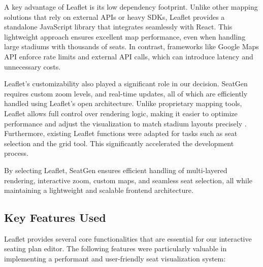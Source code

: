 A key advantage of Leaflet is its low dependency footprint. Unlike other mapping solutions that rely on external APIs or heavy SDKs, Leaflet provides a standalone JavaScript library that integrates seamlessly with React. This lightweight approach ensures excellent map performance, even when handling large stadiums with thousands of seats. In contrast, frameworks like Google Maps API enforce rate limits and external API calls, which can introduce latency and unnecessary costs.

Leaflet’s customizability also played a significant role in our decision. SeatGen requires custom zoom levels, and real-time updates, all of which are efficiently handled using Leaflet’s open architecture. Unlike proprietary mapping tools, Leaflet allows full control over rendering logic, making it easier to optimize performance and adjust the visualization to match stadium layouts precisely \cite{Leaflet}. Furthermore, existing Leaflet functions were adapted for tasks such as seat selection and the grid tool. This significantly accelerated the development process.

By selecting Leaflet, SeatGen ensures efficient handling of multi-layered rendering, interactive zoom, custom maps, and seamless seat selection, all while maintaining a lightweight and scalable frontend architecture.

\subsection{Key Features Used}

Leaflet provides several core functionalities that are essential for our interactive seating plan editor. The following features were particularly valuable in implementing a performant and user-friendly seat visualization system:

